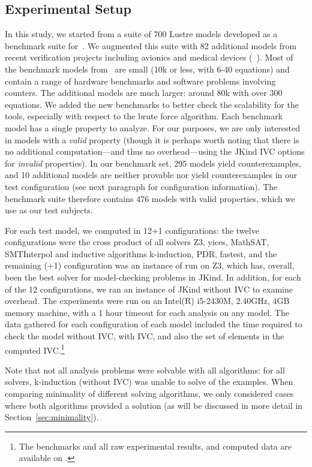 \subsection{Experimental Setup}
In this study, we started from a suite of 700 Lustre models developed as a benchmark suite for~\cite{Hagen08:FMCAD}.  We augmented this suite with 82 additional models from recent verification projects including avionics and medical devices (~\cite{QFCS15:backes,hilt2013}).  Most of the benchmark models from~\cite{Hagen08:FMCAD} are small (10k or less, with 6-40 equations) and contain a range of hardware benchmarks and software problems involving counters.  The additional models are much larger: around 80k with over 300 equations.  We added the new benchmarks to better check the scalability for the tools, especially with respect to the brute force algorithm.
%
Each benchmark model has a single property to analyze.  For our purposes, we are only interested in models with a {\em valid} property (though it is perhaps worth noting that there is no additional computation---and thus no overhead---using the JKind IVC options for {\em invalid} properties).  In our benchmark set, 295 models yield counterexamples, and 10 additional models are neither provable nor yield counterexamples in our test configuration (see next paragraph for configuration information).  The benchmark suite therefore contains 476 models with valid properties, which we use as our test subjects.

For each test model, we computed \ucalg in 12+1 configurations: the twelve configurations were the cross product of all solvers {Z3, yices, MathSAT, SMTInterpol} and inductive algorithms {k-induction, PDR, fastest}, and the remaining (+1) configuration was an instance of \bfalg run on Z3, which has, overall, been the best solver for model-checking problems in JKind.  In addition, for each of the 12 configurations, we ran an instance of JKind without IVC to examine overhead.  The experiments were run on an Intel(R) i5-2430M, 2.40GHz, 4GB memory machine, with a 1 hour timeout for each analysis on any model.  The data gathered for each configuration of each model included the time required to check the model without IVC, with IVC, and also the set of elements in the computed IVC.\footnote{The benchmarks and all raw experimental results, and computed data are available on \cite{expr}.}

Note that not all analysis problems were solvable with all algorithms: for all solvers, k-induction (without IVC) was unable to solve  of the examples.  When comparing minimality of different solving algorithms, we only considered cases where both algorithms provided a solution (as will be discussed in more detail in Section~\ref{sec:minimality}).

